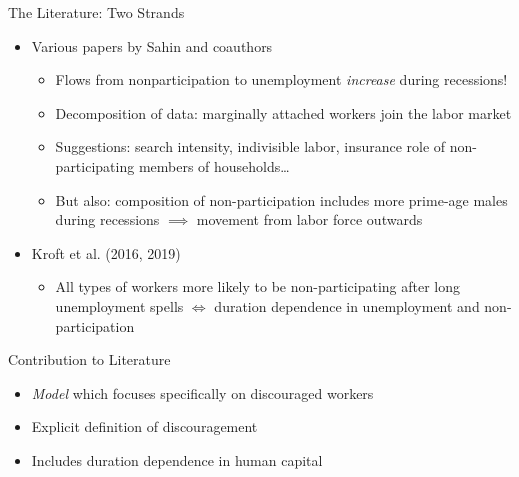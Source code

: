 \documentclass[lualatex]{beamer}
\begin{document}
\begin{frame}{The Literature: Two Strands}

\begin{itemize}

	\item Various papers by Sahin and coauthors

	\begin{itemize}

		\item Flows from nonparticipation to unemployment \textit{increase} during recessions!

		\item Decomposition of data: marginally attached workers join the labor market

		\item Suggestions: search intensity, indivisible labor, insurance role of non-participating members of households\dots

		\item But also: composition of non-participation includes more prime-age males during recessions $\implies$ movement from labor force outwards

	\end{itemize}

	\item Kroft et al. (2016, 2019)

	\begin{itemize}
		\item All types of workers more likely to be non-participating after long unemployment spells $\iff$ duration dependence in unemployment and non-participation

	\end{itemize}

\end{itemize}

\end{frame}

\begin{frame}{Contribution to Literature}

	\begin{itemize}

	\item \textit{Model} which focuses specifically on discouraged workers

	\item Explicit definition of discouragement

	\item Includes duration dependence in human capital

\end{itemize}

\end{frame}
\end{document}
